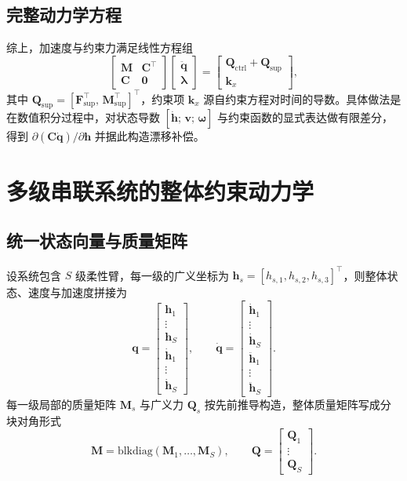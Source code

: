 \documentclass[12pt,a4paper]{article}
\begin{document}
\subsection{完整动力学方程}
综上，加速度与约束力满足线性方程组
\begin{equation}
  \begin{bmatrix}
    \bm M & \bm C^\top \\
    \bm C & \bm 0
  \end{bmatrix}
  \begin{bmatrix}
    \ddot{\bm q} \\ \bm \lambda
  \end{bmatrix} =
  \begin{bmatrix}
    \bm Q_{\text{ctrl}} + \bm Q_{\text{sup}} \\
    \bm k_x
  \end{bmatrix},
\end{equation}
其中 $\bm Q_{\text{sup}} = [\bm F_{\text{sup}}^\top,\, \bm M_{\text{sup}}^\top]^\top$，约束项 $\bm k_x$ 源自约束方程对时间的导数。具体做法是在数值积分过程中，对状态导数 $[\dot{\bm h};\, \bm v;\, \bm \omega]$ 与约束函数的显式表达做有限差分，得到 $\partial (\bm C\dot{\bm q})/\partial \bm h$ 并据此构造漂移补偿。

\section{多级串联系统的整体约束动力学}
\subsection{统一状态向量与质量矩阵}
设系统包含 $S$ 级柔性臂，每一级的广义坐标为 $\bm h_s = [h_{s,1}, h_{s,2}, h_{s,3}]^\top$，则整体状态、速度与加速度拼接为
\begin{equation}
  \bm q = \begin{bmatrix}\bm h_1\\ \vdots \\ \bm h_S\\ \dot{\bm h}_1\\ \vdots \\ \dot{\bm h}_S \end{bmatrix},
  \qquad
  \dot{\bm q} = \begin{bmatrix}\dot{\bm h}_1\\ \vdots \\ \dot{\bm h}_S\\ \ddot{\bm h}_1\\ \vdots \\ \ddot{\bm h}_S \end{bmatrix}.
\end{equation}
每一级局部的质量矩阵 $\bm M_s$ 与广义力 $\bm Q_s$ 按先前推导构造，整体质量矩阵写成分块对角形式
\begin{equation}
  \bm M = \mathrm{blkdiag}(\bm M_1, \ldots, \bm M_S),
  \qquad
  \bm Q = \begin{bmatrix} \bm Q_1 \\ \vdots \\ \bm Q_S \end{bmatrix}.
\end{equation}
\end{document}
